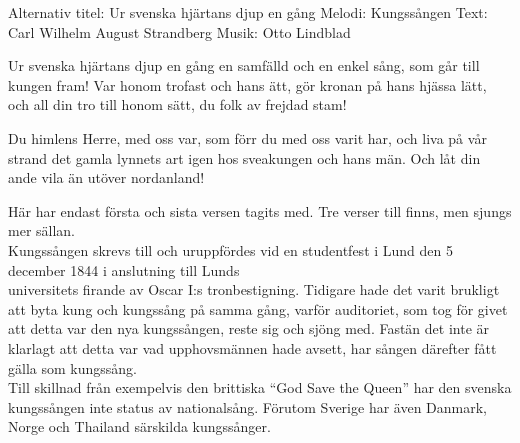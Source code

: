\begin{song}


\begin{songmeta}
Alternativ titel: Ur svenska hjärtans djup en gång
Melodi: Kungssången
Text: Carl Wilhelm August Strandberg
Musik: Otto Lindblad
\end{songmeta}

\begin{songtext}
Ur svenska hjärtans djup en gång
en samfälld och en enkel sång,
som går till kungen fram!
Var honom trofast och hans ätt,
gör kronan på hans hjässa lätt,
och all din tro till honom sätt,
du folk av frejdad stam!

Du himlens Herre, med oss var,
som förr du med oss varit har,
och liva på vår strand
det gamla lynnets art igen
hos sveakungen och hans män.
Och låt din ande vila än
utöver nordanland!
\end{songtext}

\newpage
\begin{songnotes}
Här har endast första och sista versen tagits med. Tre verser till finns, men
sjungs mer sällan. \\
Kungssången skrevs till och uruppfördes vid en studentfest i Lund den 5 december
1844 i anslutning till Lunds \\ universitets firande av Oscar I:s tronbestigning.
Tidigare hade det varit brukligt att byta kung och kungssång på samma gång,
varför auditoriet, som tog för givet att detta var den nya kungssången, reste
sig och sjöng med. Fastän det inte är klarlagt att detta var vad
upphovsmännen hade avsett, har sången därefter fått gälla som kungssång. \\
Till skillnad från exempelvis den brittiska \textquotedblleft{}God Save the Queen\textquotedblright{} har den
svenska kungssången inte status av nationalsång. Förutom Sverige har även
Danmark, Norge och Thailand särskilda kungssånger.
\end{songnotes}

\end{song}
